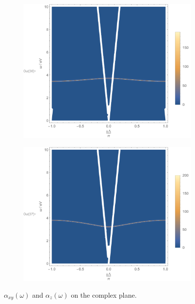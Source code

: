 \documentclass[hyperref, a4paper]{article}
\begin{document}
\begin{figure}
    \centering
    \begin{subfigure}{0.45\textwidth}
        \includegraphics[width=\textwidth]{alphaxy-complex-plane.pdf}
    \end{subfigure}
    \begin{subfigure}{0.45\textwidth}
        \includegraphics[width=\textwidth]{alphaz-complex-plane.pdf}
    \end{subfigure}
    \caption{$\alpha_{xy}(\omega)$ and $\alpha_z(\omega)$ on the complex plane. }
    \label{fig:complex-plane}
\end{figure} 
\end{document}
